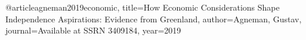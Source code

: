 @article{agneman2019economic,
  title={How Economic Considerations Shape Independence Aspirations: Evidence from Greenland},
  author={Agneman, Gustav},
  journal={Available at SSRN 3409184},
  year={2019}
}